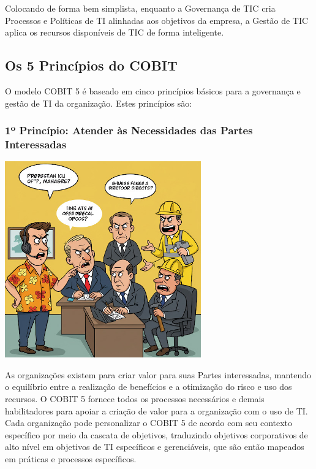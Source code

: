 \documentclass[
]{book}
\begin{document}
Colocando de forma bem simplista, enquanto a Governança de TIC cria Processos e Políticas de TI alinhadas aos objetivos da empresa, a Gestão de TIC aplica os recursos disponíveis de TIC de forma inteligente.

\subsection{Os 5 Princípios do COBIT}\label{os-5-princuxedpios-do-cobit}

O modelo COBIT 5 é baseado em cinco princípios básicos para a governança e gestão de TI da organização. Estes princípios são:

\subsubsection{1º Princípio: Atender às Necessidades das Partes Interessadas}\label{uxba-princuxedpio-atender-uxe0s-necessidades-das-partes-interessadas}

\includegraphics[width=3.33333in,height=\textheight]{images/cobit/03-principio-01-cobit.jpg}

As organizações existem para criar valor para suas Partes interessadas, mantendo o equilíbrio entre a realização de benefícios e a otimização do risco e uso dos recursos. O COBIT 5 fornece todos os processos necessários e demais habilitadores para apoiar a criação de valor para a organização com o uso de TI. Cada organização pode personalizar o COBIT 5 de acordo com seu contexto específico por meio da cascata de objetivos, traduzindo objetivos corporativos de alto nível em objetivos de TI específicos e gerenciáveis, que são então mapeados em práticas e processos específicos.
\end{document}
